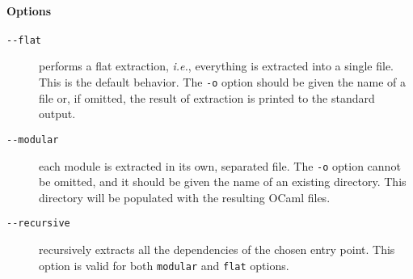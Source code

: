 \paragraph{Options}
\begin{description}
\item[\texttt{-{}-flat}] performs a flat extraction, \emph{i.e.}, everything is
  extracted into a single file. This is the default behavior. The \texttt{-o}
  option should be given the name of a file or, if omitted, the result of
  extraction is printed to the standard output.
\item[\texttt{-{}-modular}] each module is extracted in its own, separated
  file. The \texttt{-o} option cannot be omitted, and it should be given the
  name of an existing directory. This directory will be populated with the
  resulting OCaml files.
\item[\texttt{-{}-recursive}] recursively extracts all the dependencies of the
  chosen entry point. This option is valid for both \texttt{modular} and
  \texttt{flat} options.
\end{description}

